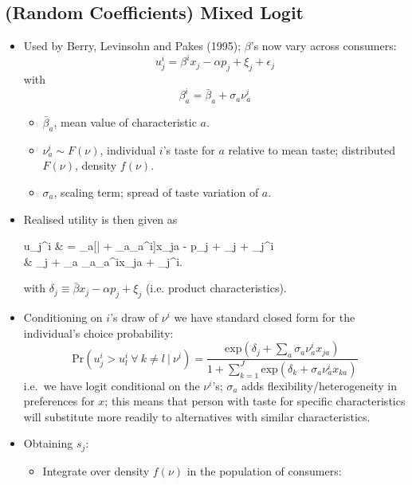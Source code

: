 \documentclass[11pt]{article}
\numberwithin{equation}{section}
\begin{document}
\subsection{(Random Coefficients) Mixed Logit}
\begin{itemize}
	\item Used by Berry, Levinsohn and Pakes (1995); $\beta$'s now vary across consumers:
	\begin{equation}
		u_j^i = \beta^ix_j - \alpha p_j + \xi_j + \epsilon_j
	\end{equation}
	with
	\begin{equation}
		\beta_a^i = \bar{\beta}_a + \sigma_a\nu_a^i
	\end{equation}
	\begin{itemize}
		\item $\bar{\beta}_a$, mean value of characteristic $a$.
		\item $\nu_a^i \sim F(\nu)$, individual $i$'s taste for $a$ relative to mean taste; distributed $F(\nu)$, density $f(\nu)$.
		\item $\sigma_a$, scaling term; spread of taste variation of $a$.
	\end{itemize}
	\item Realised utility is then given as
	\begin{flalign}
	u_j^i & = \sum_{a}[\bar{\beta} + \sigma_a\nu_a^i]x_{ja} - \alpha p_j + \xi_j + \epsilon_j^i \\
	& \equiv \delta_j + \sum_{a} \sigma_a\nu_a^ix_{ja} + \epsilon_j^i.
	\end{flalign}
	with $\delta_j \equiv \bar{\beta}x_j - \alpha p_j + \xi_j$ (i.e. product characteristics).
	\item Conditioning on $i$'s draw of $\nu^i$ we have standard closed form for the individual's choice probability:
	\begin{equation}
    \label{rcml_ratio}
		\text{Pr}(u_j^i > u_l^i ~\forall~ k\neq l~|~\nu^i) = \frac{\text{exp}(\delta_j + \sum_{a}\sigma_a\nu_a^i x_{ja})}{1 + \sum_{k=1}^{J}\text{exp}(\delta_k + \sigma_a\nu_a^i x_{ka})}
	\end{equation}
	i.e.\ we have logit conditional on the $\nu^i$'s; $\sigma_a$ adds flexibility/heterogeneity in preferences for $x$; this means that person with taste for specific characteristics will substitute more readily to alternatives with similar characteristics.
	\item Obtaining $s_j$:
	\begin{itemize}
		\item Integrate over density $f(\nu)$ in the population of consumers:

\end{itemize}
\end{itemize}
\end{document}
